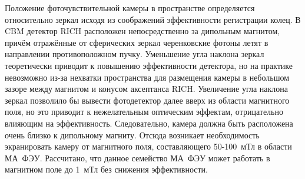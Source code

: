 

Положение фоточувствительной камеры в пространстве определяется относительно зеркал исходя из соображений эффективности регистрации колец. В CBM детектор RICH расположен непосредственно за дипольным магнитом, причём отражённые от сферических зеркал черенковские фотоны летят в направлении противоположном пучку. Уменьшение угла наклона зеркал теоретически приводит к повышению эффективности детектора, но на практике невозможно из-за нехватки пространства для размещения камеры в небольшом зазоре между магнитом и конусом аксептанса RICH. Увеличение угла наклона зеркал позволило бы вывести фотодетектор далее вверх из области магнитного поля, но это приводит к нежелательным оптическим эффектам, отрицательно влияющим на эффективность. Следовательно, камера должна быть расположена очень близко к дипольному магниту. Отсюда возникает необходимость экранировать камеру от магнитного поля, составляющего 50-100~мТл в области МА~ФЭУ. Рассчитано, что данное семейство МА~ФЭУ может работать в магнитном поле до 1~мТл без снижения эффективности.


